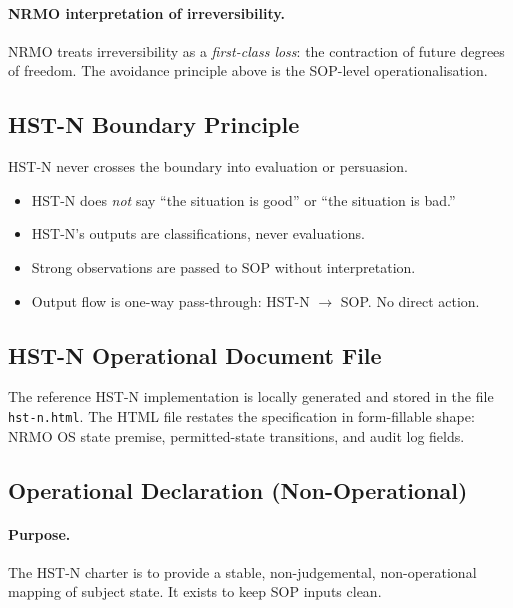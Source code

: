 \paragraph{NRMO interpretation of irreversibility.}
NRMO treats irreversibility as a \emph{first-class loss}: the
contraction of future degrees of freedom. The avoidance principle
above is the SOP-level operationalisation.

\subsection{HST-N Boundary Principle}
\label{sec:hstn-boundary-principle-c2}

HST-N never crosses the boundary into evaluation or persuasion.

\begin{itemize}
\item HST-N does \emph{not} say ``the situation is good'' or ``the
situation is bad.''
\item HST-N's outputs are classifications, never evaluations.
\item Strong observations are passed to SOP without
interpretation.
\item Output flow is one-way pass-through: HST-N $\to$ SOP. No
direct action.
\end{itemize}

\subsection{HST-N Operational Document File}
\label{sec:hstn-html-c2}

The reference HST-N implementation is locally generated and stored
in the file \texttt{hst-n.html}. The HTML file restates the
specification in form-fillable shape: NRMO OS state premise,
permitted-state transitions, and audit log fields.

\subsection{Operational Declaration (Non-Operational)}
\label{sec:hstn-operational-declaration-c2}


\paragraph{Purpose.}
The HST-N charter is to provide a stable, non-judgemental,
non-operational mapping of subject state. It exists to keep SOP
inputs clean.

